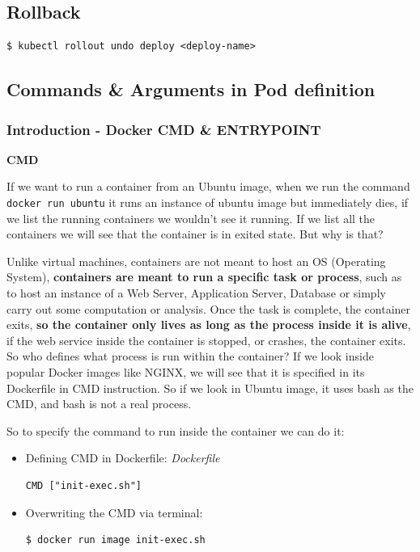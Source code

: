 \documentclass{article}
\newenvironment{codetemplate}[1][]{%
  \mybasecolorbox[#1]
  \itshape
}{%
  \endmybasecolorbox
}
\begin{document}
\subsection{Rollback}
\begin{codetemplate}{}
\begin{verbatim}
$ kubectl rollout undo deploy <deploy-name>
\end{verbatim}
\end{codetemplate}

\subsection{Commands \& Arguments in Pod definition}

\subsubsection{Introduction - Docker CMD \& ENTRYPOINT}

\textbf{CMD}

If we want to run a container from an Ubuntu image, when we run the command \verb|docker run ubuntu| it runs an instance of ubuntu image but immediately dies, if we list the running containers we wouldn't see it running. If we list all the containers we will see that the container is in exited state. But why is that?

Unlike virtual machines, containers are not meant to host an OS (Operating System), \textbf{containers are meant to run a specific task or process}, such as to host an instance of a Web Server, Application Server, Database or simply carry out some computation or analysis. Once the task is complete, the container exits, \textbf{so the container only lives as long as the process inside it is alive}, if the web service inside the container is stopped, or crashes, the container exits. So who defines what process is run within the container? If we look inside popular Docker images like NGINX, we will see that it is specified in its Dockerfile in CMD instruction. So if we look in Ubuntu image, it uses bash as the CMD, and bash is not a real process.

So to specify the command to run inside the container we can do it:

\begin{itemize}
    \item Defining CMD in Dockerfile:
\begin{codetemplate}{Dockerfile}
\begin{verbatim}
CMD ["init-exec.sh"]
\end{verbatim}
\end{codetemplate}

    \item Overwriting the CMD via terminal:
\begin{codetemplate}{}
\begin{verbatim}
$ docker run image init-exec.sh
\end{verbatim}
\end{codetemplate}
\end{itemize}
\end{document}
